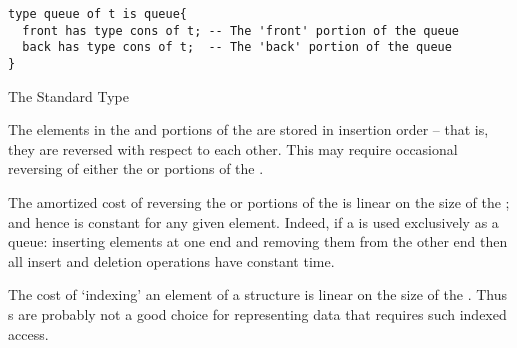 \begin{program}
\begin{lstlisting}
type queue of t is queue{
  front has type cons of t; -- The 'front' portion of the queue
  back has type cons of t;  -- The 'back' portion of the queue
}
\end{lstlisting}
\caption{The Standard  Type}\label{queueTypeProg}
\end{program}
\begin{aside}
The elements in the  and  portions of the  are stored in insertion order -- that is, they are reversed with respect to each other. This may require occasional reversing of either the  or  portions of the .
\end{aside}

\begin{aside}
The amortized cost of reversing the   or  portions of the  is linear on the size of the ; and hence is constant for any given element. Indeed, if a  is used exclusively as a queue: inserting elements at one end and removing them from the other end then all insert and deletion operations have constant time.
\end{aside}

\begin{aside}
The cost of `indexing' an element of a  structure is linear on the size of the . Thus s are probably not a good choice for representing data that requires such indexed access.
\end{aside}
